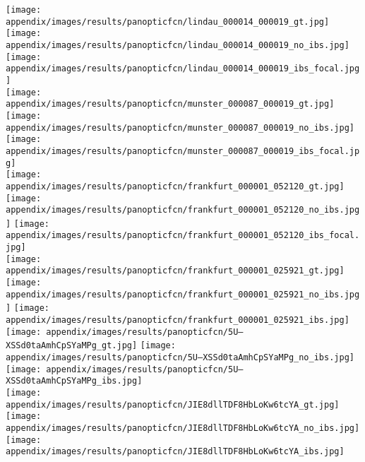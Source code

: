 \documentclass[10pt,twocolumn,letterpaper]{article}
\begin{document}
\begin{figure*}[t]
\centering
\texttt{[image: appendix/images/results/panopticfcn/lindau\_000014\_000019\_gt.jpg]}
\texttt{[image: appendix/images/results/panopticfcn/lindau\_000014\_000019\_no\_ibs.jpg]}
\texttt{[image: appendix/images/results/panopticfcn/lindau\_000014\_000019\_ibs\_focal.jpg]}
\\

\texttt{[image: appendix/images/results/panopticfcn/munster\_000087\_000019\_gt.jpg]}
\texttt{[image: appendix/images/results/panopticfcn/munster\_000087\_000019\_no\_ibs.jpg]}
\texttt{[image: appendix/images/results/panopticfcn/munster\_000087\_000019\_ibs\_focal.jpg]}
\\

\texttt{[image: appendix/images/results/panopticfcn/frankfurt\_000001\_052120\_gt.jpg]}
\texttt{[image: appendix/images/results/panopticfcn/frankfurt\_000001\_052120\_no\_ibs.jpg]}
\texttt{[image: appendix/images/results/panopticfcn/frankfurt\_000001\_052120\_ibs\_focal.jpg]}
\\

\texttt{[image: appendix/images/results/panopticfcn/frankfurt\_000001\_025921\_gt.jpg]}
\texttt{[image: appendix/images/results/panopticfcn/frankfurt\_000001\_025921\_no\_ibs.jpg]}
\texttt{[image: appendix/images/results/panopticfcn/frankfurt\_000001\_025921\_ibs.jpg]}
\\



\texttt{[image: appendix/images/results/panopticfcn/5U--XSSd0taAmhCpSYaMPg\_gt.jpg]}
\texttt{[image: appendix/images/results/panopticfcn/5U--XSSd0taAmhCpSYaMPg\_no\_ibs.jpg]}
\texttt{[image: appendix/images/results/panopticfcn/5U--XSSd0taAmhCpSYaMPg\_ibs.jpg]}
\\

\texttt{[image: appendix/images/results/panopticfcn/JIE8dllTDF8HbLoKw6tcYA\_gt.jpg]}
\texttt{[image: appendix/images/results/panopticfcn/JIE8dllTDF8HbLoKw6tcYA\_no\_ibs.jpg]}
\texttt{[image: appendix/images/results/panopticfcn/JIE8dllTDF8HbLoKw6tcYA\_ibs.jpg]}
\\


\end{figure*}
\end{document}
